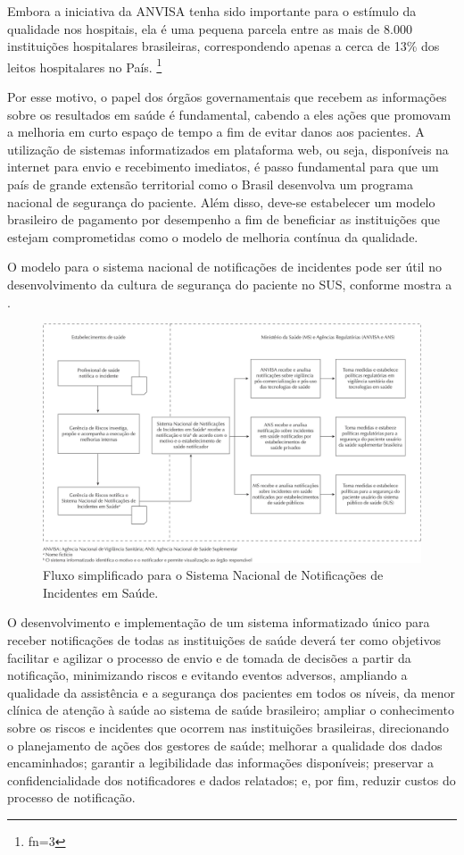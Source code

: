 \documentclass{article}
\makeatletter
\newcommand{\fn}{\afterassignment\fn@aux\count0=}
\newcommand{\fn@aux}{\csname fn\the\count0\endcsname}
\makeatother
\begin{document}
Embora a iniciativa da ANVISA tenha sido importante para o estímulo da qualidade
nos
hospitais, ela é uma pequena parcela entre as mais de 8.000 instituições
hospitalares
brasileiras, correspondendo apenas a cerca de 13\% dos leitos hospitalares no
País. \footnote{\fn3}

Por esse motivo, o papel dos órgãos governamentais que recebem as informações
sobre os
resultados em saúde é fundamental, cabendo a eles ações que promovam a melhoria
em curto
espaço de tempo a fim de evitar danos aos pacientes. A utilização de sistemas
informatizados
em plataforma web, ou seja, disponíveis na internet para envio e recebimento
imediatos, é
passo fundamental para que um país de grande extensão territorial como o Brasil
desenvolva
um programa nacional de segurança do paciente. Além disso, deve-se estabelecer
um modelo
brasileiro de pagamento por desempenho a fim de beneficiar as instituições que
estejam
comprometidas como o modelo de melhoria contínua da qualidade.

O modelo para o sistema nacional de notificações de incidentes pode ser útil no
desenvolvimento da cultura de segurança do paciente no SUS, conforme mostra a
.

\begin{figure}
\includegraphics[width=\textwidth]{0034-8910-rsp-47-04-0791-gf01}
\caption{Fluxo simplificado para o Sistema Nacional de Notificações de
Incidentes em
Saúde.}
\end{figure}

O desenvolvimento e implementação de um sistema informatizado único para receber
notificações de todas as instituições de saúde deverá ter como objetivos
facilitar e
agilizar o processo de envio e de tomada de decisões a partir da notificação,
minimizando
riscos e evitando eventos adversos, ampliando a qualidade da assistência e a
segurança dos
pacientes em todos os níveis, da menor clínica de atenção à saúde ao sistema de
saúde
brasileiro; ampliar o conhecimento sobre os riscos e incidentes que ocorrem nas
instituições
brasileiras, direcionando o planejamento de ações dos gestores de saúde;
melhorar a
qualidade dos dados encaminhados; garantir a legibilidade das informações
disponíveis;
preservar a confidencialidade dos notificadores e dados relatados; e, por fim,
reduzir
custos do processo de notificação.
\end{document}

